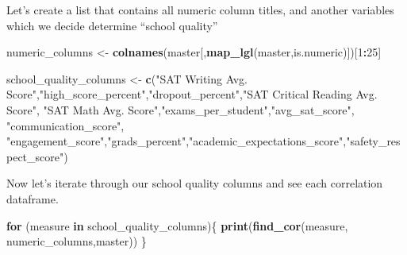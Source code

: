 \documentclass[]{article}
\newenvironment{Shaded}{\begin{snugshade}}{\end{snugshade}}
\newcommand{\ControlFlowTok}[1]{\textcolor[rgb]{0.13,0.29,0.53}{\textbf{#1}}}
\newcommand{\DecValTok}[1]{\textcolor[rgb]{0.00,0.00,0.81}{#1}}
\newcommand{\KeywordTok}[1]{\textcolor[rgb]{0.13,0.29,0.53}{\textbf{#1}}}
\newcommand{\NormalTok}[1]{#1}
\newcommand{\OperatorTok}[1]{\textcolor[rgb]{0.81,0.36,0.00}{\textbf{#1}}}
\newcommand{\StringTok}[1]{\textcolor[rgb]{0.31,0.60,0.02}{#1}}
\begin{document}
Let's create a list that contains all numeric column titles, and another
variables which we decide determine ``school quality''

\begin{Shaded}
\begin{Highlighting}[]
\NormalTok{numeric_columns <-}\StringTok{ }\KeywordTok{colnames}\NormalTok{(master[,}\KeywordTok{map_lgl}\NormalTok{(master,is.numeric)])[}\DecValTok{1}\OperatorTok{:}\DecValTok{25}\NormalTok{]}

\NormalTok{school_quality_columns <-}\StringTok{ }\KeywordTok{c}\NormalTok{(}\StringTok{"SAT Writing Avg. Score"}\NormalTok{,}\StringTok{"high_score_percent"}\NormalTok{,}\StringTok{"dropout_percent"}\NormalTok{,}\StringTok{"SAT Critical Reading Avg. Score"}\NormalTok{,}
                               \StringTok{"SAT Math Avg. Score"}\NormalTok{,}\StringTok{"exams_per_student"}\NormalTok{,}\StringTok{"avg_sat_score"}\NormalTok{, }\StringTok{"communication_score"}\NormalTok{,}
                               \StringTok{"engagement_score"}\NormalTok{,}\StringTok{"grads_percent"}\NormalTok{,}\StringTok{"academic_expectations_score"}\NormalTok{,}\StringTok{"safety_respect_score"}\NormalTok{)}
\end{Highlighting}
\end{Shaded}

Now let's iterate through our school quality columns and see each
correlation dataframe.

\begin{Shaded}
\begin{Highlighting}[]
\ControlFlowTok{for}\NormalTok{ (measure }\ControlFlowTok{in}\NormalTok{ school_quality_columns)\{}
  \KeywordTok{print}\NormalTok{(}\KeywordTok{find_cor}\NormalTok{(measure, numeric_columns,master))}
\NormalTok{\}}
\end{Highlighting}
\end{Shaded}
\end{document}
